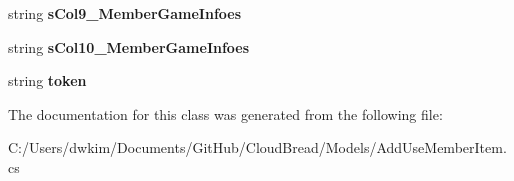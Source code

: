 \begin{DoxyCompactItemize}
\item 
string {\bfseries s\+Col9\+\_\+\+Member\+Game\+Infoes}\hypertarget{a00005_a5840bb27826d54372dad2d3afb537090}{}\label{a00005_a5840bb27826d54372dad2d3afb537090}

\item 
string {\bfseries s\+Col10\+\_\+\+Member\+Game\+Infoes}\hypertarget{a00005_aa5b1c05b41a52021ec20daa00060c05f}{}\label{a00005_aa5b1c05b41a52021ec20daa00060c05f}

\item 
string {\bfseries token}\hypertarget{a00005_a26902c25234a4ed8330b712ea80c70fd}{}\label{a00005_a26902c25234a4ed8330b712ea80c70fd}

\end{DoxyCompactItemize}


The documentation for this class was generated from the following file\+:\begin{DoxyCompactItemize}
\item 
C\+:/\+Users/dwkim/\+Documents/\+Git\+Hub/\+Cloud\+Bread/\+Models/Add\+Use\+Member\+Item.\+cs\end{DoxyCompactItemize}
